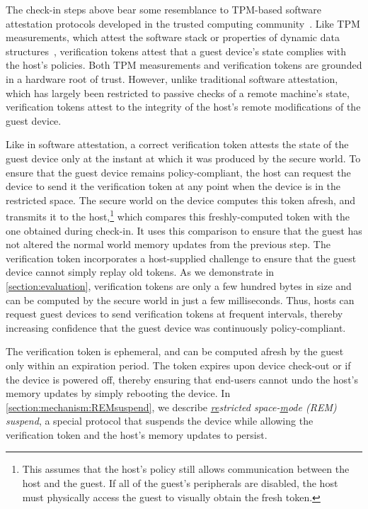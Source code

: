 \documentclass[pageno]{sig-alternate-05-2015}
\newcommand{\sectref}[1]{\autoref{#1}}
\newcommand*\circled[1]{\tikz[baseline=(char.base)]{
            \node[shape=circle,draw,inner sep=0.5pt] (char) {#1};}}
\newcounter{myctr}
\newenvironment{mylist}{\begin{list}{\textbf{\circled{\arabic{myctr}}}}
{\usecounter{myctr}
\setlength{\topsep}{1mm}\setlength{\itemsep}{0.5mm}
\setlength{\parsep}{0.5mm}
\setlength{\listparindent}{\parindent} %
\setlength{\itemindent}{0mm}\setlength{\partopsep}{0mm}
\setlength{\labelwidth}{-2mm}
\setlength{\leftmargin}{0mm}}}{\end{list}}
\newcommand{\addtext}[2]{#2}
\begin{document}
\begin{mylist}
\addtext{Task 5}{The check-in steps above bear some resemblance to TPM-based
software attestation protocols developed in the trusted computing
community~\cite{Sailer04}. Like TPM measurements, which attest the software
stack or properties of dynamic data structures~\cite{sadeghi:isc08},
verification tokens attest that a guest device's state complies with the host's
policies. Both TPM measurements and verification tokens are grounded in a
hardware root of trust.  However, unlike traditional software attestation,
which has largely been restricted to passive checks of a remote machine's
state, verification tokens attest to the integrity of the host's remote
modifications of the guest device.}

\addtext{Task 1}{Like in software attestation, a correct verification token
attests the state of the guest device only at the instant at which it was
produced by the secure world. To ensure that the guest device remains
policy-compliant, the host can request the device to send it the verification
token at any point when the device is in the restricted space.} 
The secure world on the device computes this token afresh, and transmits it to
the host,\footnote{This assumes that the host's policy still allows
communication between the host and the guest. If all of the guest's peripherals
are disabled, the host must physically access the guest to visually obtain the
fresh token.} which compares this freshly-computed token with the one obtained
during check-in. It uses this comparison to ensure that the guest has not
altered the normal world memory updates from the previous step. The
verification token incorporates a host-supplied challenge to ensure that the
guest device cannot simply replay old tokens. 
\addtext{Task 1}{As we demonstrate in \sectref{section:evaluation},
verification tokens are only a few hundred bytes in size and can be computed by
the secure world in just a few milliseconds. Thus, hosts can request guest
devices to send verification tokens at frequent intervals, thereby increasing
confidence that the guest device was continuously policy-compliant.}

The verification token is ephemeral, and can be computed afresh by the guest
only within an expiration period. The token expires upon device check-out or if
the device is powered off, thereby ensuring that end-users cannot undo the
host's memory updates by simply rebooting the device.  In
\sectref{section:mechanism:REMsuspend}, we describe
\textit{\underline{re}stricted space-\underline{m}ode (REM) suspend}, a special
protocol that suspends the device while allowing the verification token and the
host's memory updates to persist.
%
\end{mylist}
\end{document}

